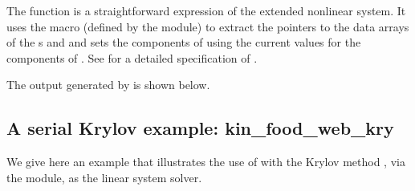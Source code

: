 The function  is a straightforward expression of the extended nonlinear 
system. It uses the macro  (defined by the {\nvecs} module)
to extract the pointers to the data arrays of the s  and 
and sets the components of  using the current values for the components
of .
See  for a detailed specification of .

The output generated by  is shown below.




\subsection{A serial Krylov example: kin\_food\_web\_kry}\label{ss:kin_food_web_kry}

We give here an example that illustrates the use of {\kinsol} with the Krylov
method {\spgmr}, via the {\sunlinsolspgmr} module, as the linear system solver.

